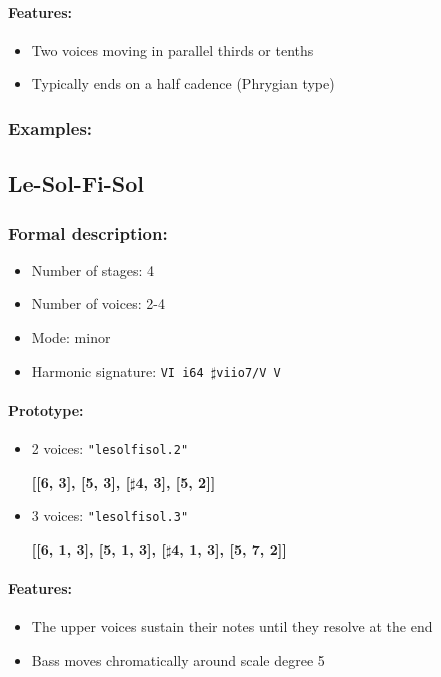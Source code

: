 ﻿\documentclass[11pt, openany]{article}
\begin{document}
\begin{itemize}
\paragraph{Features:}
\begin{itemize}
\item Two voices moving in parallel thirds or tenths
\item Typically ends on a half cadence (Phrygian type)
\end{itemize}

\subsubsection{Examples:}


	\subsection{Le-Sol-Fi-Sol}
	
\subsubsection{Formal description:}
\begin{itemize}
\item Number of stages: 4
\item Number of voices: 2-4
\item Mode: minor
\item Harmonic signature: \texttt{VI i64 $\sharp$viio7/V V}
\end{itemize}

\paragraph{Prototype:}
\begin{itemize}
\item 2 voices: \texttt{"lesolfisol.2"}
	\begin{center}
	\textbf{[[6, 3], [5, 3], [$\sharp$4, 3], [5, 2]]}
	\end{center}
\item 3 voices: \texttt{"lesolfisol.3"}
	\begin{center}
	\textbf{[[6, 1, 3], [5, 1, 3], [$\sharp$4, 1, 3], [5, 7, 2]]}
	\end{center}
\end{itemize}

\paragraph{Features:}
\begin{itemize}
\item The upper voices sustain their notes until they resolve at the end
\item Bass moves chromatically around scale degree 5
\end{itemize}


\end{itemize}
\end{document}
